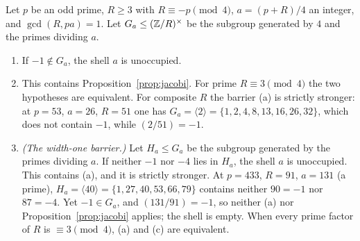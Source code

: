 \begin{proposition}\label{prop:groupbarrier}
Let $p$ be an odd prime, $R\ge3$ with $R\equiv-p\pmod4$, $a=(p+R)/4$ an integer, and $\gcd(R,pa)=1$. Let $G_a\le(\mathbb{Z}/R)^\times$ be the subgroup generated by $4$ and the primes dividing $a$.
\begin{enumerate}[label=(\alph*)]
\item If $-1\notin G_a$, the shell $a$ is unoccupied.
\item This contains Proposition~\ref{prop:jacobi}. For prime $R\equiv3\pmod4$ the two hypotheses are equivalent. For composite $R$ the barrier (a) is strictly stronger: at $p=53$, $a=26$, $R=51$ one has $G_a=\langle2\rangle=\{1,2,4,8,13,16,26,32\}$, which does not contain $-1$, while $(2/51)=-1$.
\item \emph{(The width-one barrier.)} Let $H_a\le G_a$ be the subgroup generated by the primes dividing $a$. If neither $-1$ nor $-4$ lies in $H_a$, the shell $a$ is unoccupied. This contains (a), and it is strictly stronger. At $p=433$, $R=91$, $a=131$ (a prime), $H_a=\langle40\rangle=\{1,27,40,53,66,79\}$ contains neither $90=-1$ nor $87=-4$. Yet $-1\in G_a$, and $(131/91)=-1$, so neither (a) nor Proposition~\ref{prop:jacobi} applies; the shell is empty. When every prime factor of $R$ is $\equiv3\pmod4$, (a) and (c) are equivalent.
\end{enumerate}
\end{proposition}
